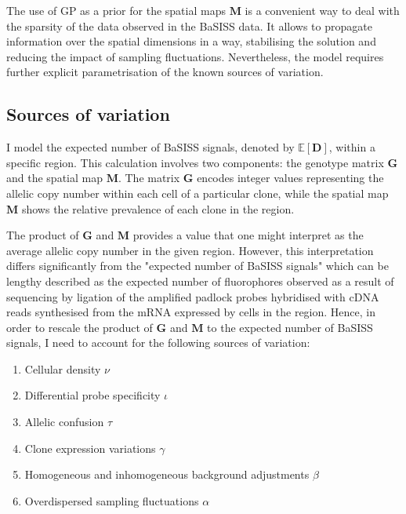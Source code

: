 The use of \ac{GP} as a prior for the spatial maps $\mathbf{M}$ is a convenient way to deal with the sparsity of the data observed in the \ac{BaSISS} data. It allows to propagate information over the spatial dimensions in a  way, stabilising the solution and reducing the impact of sampling fluctuations. Nevertheless, the model requires further explicit parametrisation of the known sources of variation.

\subsection{Sources of variation}

I model the expected number of \ac{BaSISS} signals, denoted by $\mathbb{E}[\mathbf{D}]$, within a specific region. This calculation involves two components: the genotype matrix $\mathbf{G}$ and the spatial map $\mathbf{M}$. The matrix $\mathbf{G}$ encodes integer values representing the allelic copy number within each cell of a particular clone, while the spatial map $\mathbf{M}$ shows the relative prevalence of each clone in the region.

The product of $\mathbf{G}$ and $\mathbf{M}$ provides a value that one might interpret as the average allelic copy number in the given region. However, this interpretation differs significantly from the "expected number of \ac{BaSISS} signals" which can be lengthy described as the expected number of fluorophores observed as a result of sequencing by ligation of the amplified padlock probes hybridised with cDNA reads synthesised from the mRNA expressed by cells in the region. Hence, in order to rescale the product of $\mathbf{G}$ and $\mathbf{M}$ to the expected number of \ac{BaSISS} signals, I need to account for the following sources of variation:

\begin{enumerate}
    \item Cellular density $\nu$
    \item Differential probe specificity $\iota$
    \item Allelic confusion $\tau$
    \item Clone expression variations $\gamma$
    \item Homogeneous and inhomogeneous background adjustments $\beta$
    \item Overdispersed sampling fluctuations $\alpha$
\end{enumerate}

